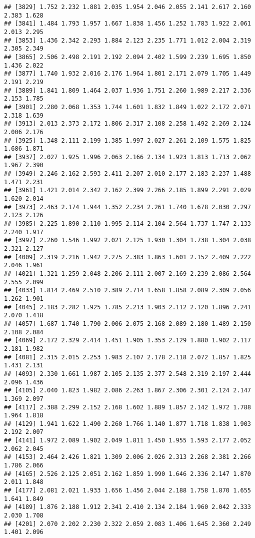 \documentclass[
]{article}
\begin{document}
\begin{verbatim}
## [3829] 1.752 2.232 1.881 2.035 1.954 2.046 2.055 2.141 2.617 2.160 2.383 1.628
## [3841] 1.484 1.793 1.957 1.667 1.838 1.456 1.252 1.783 1.922 2.061 2.013 2.295
## [3853] 1.436 2.342 2.293 1.884 2.123 2.235 1.771 1.012 2.004 2.319 2.305 2.349
## [3865] 2.506 2.498 2.191 2.192 2.094 2.402 1.599 2.239 1.695 1.850 1.436 2.022
## [3877] 1.740 1.932 2.016 2.176 1.964 1.801 2.171 2.079 1.705 1.449 2.191 2.219
## [3889] 1.841 1.809 1.464 2.037 1.936 1.751 2.260 1.989 2.217 2.336 2.153 1.785
## [3901] 2.280 2.068 1.353 1.744 1.601 1.832 1.849 1.022 2.172 2.071 2.318 1.639
## [3913] 2.013 2.373 2.172 1.806 2.317 2.108 2.258 1.492 2.269 2.124 2.006 2.176
## [3925] 1.348 2.111 2.199 1.385 1.997 2.027 2.261 2.109 1.575 1.825 1.686 1.871
## [3937] 2.027 1.925 1.996 2.063 2.166 2.134 1.923 1.813 1.713 2.062 1.967 2.390
## [3949] 2.246 2.162 2.593 2.411 2.207 2.010 2.177 2.183 2.237 1.488 1.471 2.231
## [3961] 1.421 2.014 2.342 2.162 2.399 2.266 2.185 1.899 2.291 2.029 1.620 2.014
## [3973] 2.463 2.174 1.944 1.352 2.234 2.261 1.740 1.678 2.030 2.297 2.123 2.126
## [3985] 2.225 1.890 2.110 1.995 2.114 2.104 2.564 1.737 1.747 2.133 2.240 1.917
## [3997] 2.260 1.546 1.992 2.021 2.125 1.930 1.304 1.738 1.304 2.038 2.321 2.127
## [4009] 2.319 2.216 1.942 2.275 2.383 1.863 1.601 2.152 2.409 2.222 2.046 1.961
## [4021] 1.321 1.259 2.048 2.206 2.111 2.007 2.169 2.239 2.086 2.564 2.555 2.099
## [4033] 1.814 2.469 2.510 2.389 2.714 1.658 1.858 2.089 2.309 2.056 1.262 1.901
## [4045] 2.183 2.282 1.925 1.785 2.213 1.903 2.112 2.120 1.896 2.241 2.070 1.418
## [4057] 1.687 1.740 1.790 2.006 2.075 2.168 2.089 2.180 1.489 2.150 2.108 2.084
## [4069] 2.172 2.329 2.414 1.451 1.905 1.353 2.129 1.880 1.902 2.117 2.181 1.982
## [4081] 2.315 2.015 2.253 1.983 2.107 2.178 2.118 2.072 1.857 1.825 1.431 2.131
## [4093] 2.330 1.661 1.987 2.105 2.135 2.377 2.548 2.319 2.197 2.444 2.096 1.436
## [4105] 2.040 1.823 1.982 2.086 2.263 1.867 2.306 2.301 2.124 2.147 1.369 2.097
## [4117] 2.388 2.299 2.152 2.168 1.602 1.889 1.857 2.142 1.972 1.788 1.964 1.818
## [4129] 1.941 1.622 1.490 2.260 1.766 1.140 1.877 1.718 1.838 1.903 2.192 2.007
## [4141] 1.972 2.089 1.902 2.049 1.811 1.450 1.955 1.593 2.177 2.052 2.062 2.045
## [4153] 2.464 2.426 1.821 1.309 2.006 2.026 2.313 2.268 2.381 2.266 1.786 2.066
## [4165] 2.526 2.125 2.051 2.162 1.859 1.990 1.646 2.336 2.147 1.870 2.011 1.848
## [4177] 2.081 2.021 1.933 1.656 1.456 2.044 2.188 1.758 1.870 1.655 1.641 1.849
## [4189] 1.876 2.188 1.912 2.341 2.410 2.134 2.184 1.960 2.042 2.333 2.030 1.708
## [4201] 2.070 2.202 2.230 2.322 2.059 2.083 1.406 1.645 2.360 2.249 1.401 2.096

\end{verbatim}
\end{document}
